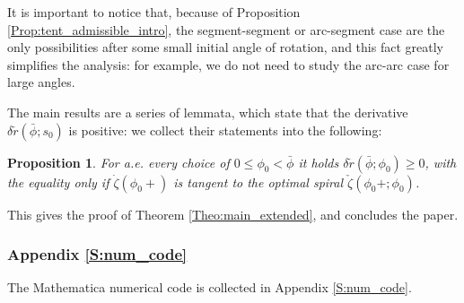 \documentclass[reqno]{amsart}
\theoremstyle{definition} \newtheorem{definition}{Definition}[section]
\theoremstyle{definition} \newtheorem{remark}[definition]{Remark}
\theoremstyle{plain} \newtheorem{lemma}[definition]{Lemma}
\theoremstyle{plain} \newtheorem{proposition}[definition]{Proposition}
\theoremstyle{plain} \newtheorem{theorem}[definition]{Theorem}
\theoremstyle{plain} \newtheorem{corollary}[definition]{Corollary}
\theoremstyle{definition} \newtheorem{example}[definition]{Example}
\theoremstyle{plain} \newtheorem{claim}[clai]{Claim}
\theoremstyle{definition} \newtheorem{assumption}[definition]{Assumption}
\theoremstyle{definition} \newtheorem{observation}[definition]{Observation}
\newcommand{\1}{\mathbbm 1}
\numberwithin{equation}{section} %
\theoremstyle{plain} \newtheorem*{theorem*}{Theorem}
\theoremstyle{plain} \newtheorem{mthm}[maintheorem]{Main Theorem}
\theoremstyle{plain} \newtheorem*{mthm*}{Main Theorem}
\theoremstyle{plain} \newtheorem*{conjecture*}{Conjecture}
\theoremstyle{plain} \newtheorem{conjecture}[definition]{Conjecture}
\theoremstyle{plain} \newtheorem*{problem*}{Problem}
\begin{document}
It is important to notice that, because of Proposition \ref{Prop:tent_admissible_intro}, the segment-segment or arc-segment case are the only possibilities after some small initial angle of rotation, and this fact greatly simplifies the analysis: for example, we do not need to study the arc-arc case for large angles.

The main results are a series of lemmata, which state that the derivative $\delta \check r(\bar \phi;s_0)$ is positive: we collect their statements into the following:

\begin{proposition}
\label{Prop:deltacheckr_intro}
For a.e. every choice of $0 \leq \phi_0 < \bar \phi$ it holds $\delta \check r(\bar \phi;\phi_0) \geq 0$, with the equality only if $\dot \zeta(\phi_0+)$ is tangent to the optimal spiral $\check \zeta(\phi_0+;\phi_0)$.
\end{proposition}

This gives the proof of Theorem \ref{Theo:main_extended}, and concludes the paper.


\subsubsection{Appendix \ref{S:num_code}}
\label{Sss:num_code_intro}


The Mathematica numerical code is collected in Appendix \ref{S:num_code}.
\end{document}
